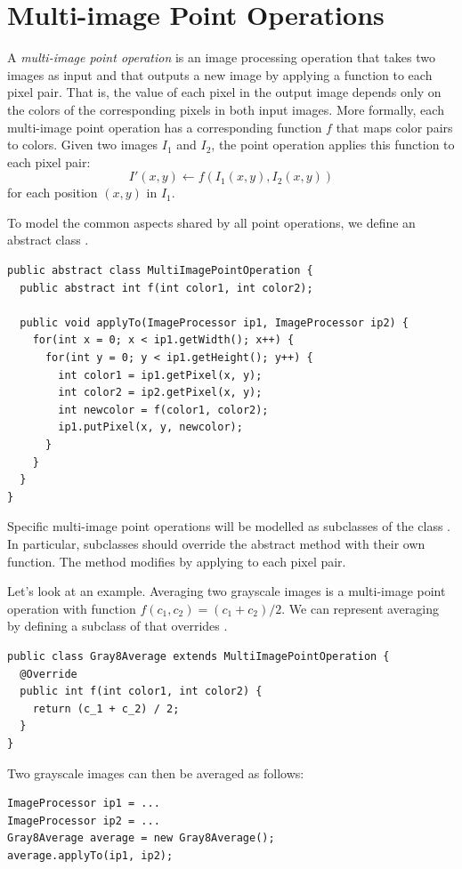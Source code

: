 \documentclass{book}
\begin{document}
\section{Multi-image Point Operations}
A \emph{multi-image point operation} is an image processing operation that takes two images as input and that outputs a new image by applying a function to each pixel pair. That is, the value of each pixel in the output image depends only on the colors of the corresponding pixels in both input images. More formally, each multi-image point operation has a corresponding function $f$ that maps color pairs to colors. Given two images $I_1$ and $I_2$, the point operation applies this function to each pixel pair:
$$I'(x, y) \leftarrow f(I_1(x, y), I_2(x, y))$$
for each position $(x, y)$ in $I_1$.

To model the common aspects shared by all point operations, we define an abstract class . 
\begin{lstlisting}
public abstract class MultiImagePointOperation {
  public abstract int f(int color1, int color2);
  
  public void applyTo(ImageProcessor ip1, ImageProcessor ip2) {
    for(int x = 0; x < ip1.getWidth(); x++) {
      for(int y = 0; y < ip1.getHeight(); y++) {
        int color1 = ip1.getPixel(x, y);
        int color2 = ip2.getPixel(x, y);
        int newcolor = f(color1, color2);
        ip1.putPixel(x, y, newcolor);
      }    
    }
  }
}
\end{lstlisting}
Specific multi-image point operations will be modelled as subclasses of the class . In particular, subclasses should override the abstract method  with their own function. The method  modifies  by applying  to each pixel pair.

Let's look at an example. Averaging two grayscale images is a multi-image point operation with function $f(c_1, c_2) = (c_1 + c_2) / 2$. We can represent averaging by defining a subclass of  that overrides . 
\begin{lstlisting}
public class Gray8Average extends MultiImagePointOperation {
  @Override  
  public int f(int color1, int color2) {
    return (c_1 + c_2) / 2;
  }
}
\end{lstlisting}
Two grayscale images can then be averaged as follows:
\begin{lstlisting}
ImageProcessor ip1 = ...
ImageProcessor ip2 = ...
Gray8Average average = new Gray8Average();
average.applyTo(ip1, ip2);
\end{lstlisting}
\end{document}
